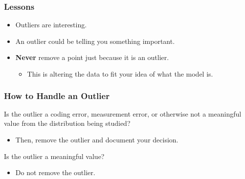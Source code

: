 \documentclass[12pt, block=fill]{beamer}
\begin{document}
\begin{frame}
  \frametitle{Lessons}

  \begin{itemize}
  \item Outliers are interesting.
  \item An outlier could be telling you something important.
  \item \textbf{Never} remove a point just because it is an outlier.

    \begin{itemize}
    \item This is altering the data to fit your idea of what the model is.
  \end{itemize}
\end{itemize}

\end{frame}

\begin{frame}
  \frametitle{How to Handle an Outlier}
  Is the outlier a coding error, measurement error, or
  otherwise not a meaningful value from the distribution being
  studied?

  \begin{itemize}
  \item Then, remove the outlier and document your decision.
  \end{itemize}

  Is the outlier a meaningful value?

  \begin{itemize}
  \item Do not remove the outlier.
  \end{itemize}
\end{frame}
\end{document}
